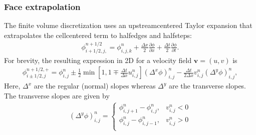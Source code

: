 \documentclass[letterpaper,10pt,english]{sphinxmanual}
\begin{document}
\subsubsection{Face extrapolation}
\label{\detokenize{Solvers/CDR:face-extrapolation}}
The finite volume discretization uses an upstream\sphinxhyphen{}centered Taylor expansion that extrapolates the cell\sphinxhyphen{}centered term to half\sphinxhyphen{}edges and half\sphinxhyphen{}steps:
\begin{equation*}
\begin{split}\phi_{i+1/2,j,}^{n+1/2} = \phi_{i,j,k}^n + \frac{\Delta x}{2}\frac{\partial \phi}{\partial x} + \frac{\Delta t}{2}\frac{\partial \phi}{\partial t}.\end{split}
\end{equation*}
For brevity, the resulting expression in 2D for a velocity field \(\mathbf{v} = (u,v)\) is
\begin{equation*}
\begin{split}\phi_{i\pm1/2,j}^{n+1/2,+} = \phi_{i,j}^n \pm \frac{1}{2}\min\left[1, 1 \mp \frac{\Delta t}{\Delta x}u_{i,j}^n\right]\left(\Delta^x\phi\right)_{i,j}^n - \frac{\Delta t}{2\Delta x}v_{i,j}^n\left(\Delta^y\phi\right)_{i,j}^n,\end{split}
\end{equation*}
Here, \(\Delta^x\) are the regular (normal) slopes whereas \(\Delta^y\) are the transverse slopes.
The transverse slopes are given by
\begin{equation*}
\begin{split}(\Delta^y\phi)_{i,j}^n = \begin{cases}
\phi_{i,j+1}^n - \phi_{i,j}^n, & v_{i,j}^n < 0 \\
\phi_{i,j}^n - \phi_{i,j-1}^n, & v_{i,j}^n > 0 \\
\end{cases}\end{split}
\end{equation*}
\end{document}
